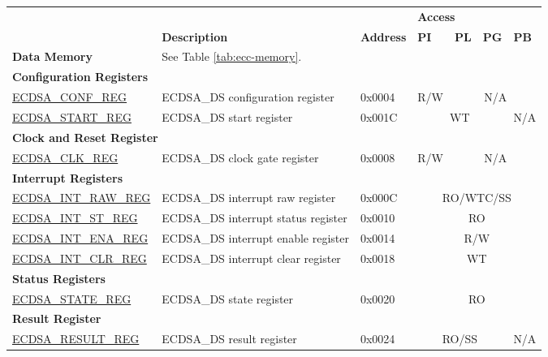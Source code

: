 \begin{longtable}{ | p{4.8cm} | l | p{1.3cm} | l | l | l | l | }
\hline
\rowcolor{lightgray}
 &  &   & \multicolumn{4}{|l|}{\textbf{Access}} \\\cline{4-7}
\rowcolor{lightgray}
\multirow{-2}{*}{\textbf{Name}} & \multirow{-2}{*}{\textbf{Description}}  &  \multirow{-2}{*}{\textbf{Address}} & \textbf{PI} & \textbf{PL} & \textbf{PG} & \textbf{PB} \\ \hline
\endhead
\textbf{Data Memory} & \multicolumn{6}{|l|}{See Table \ref{tab:ecc-memory}.} \\ \hline
\multicolumn{7}{|l|}{\textbf{Configuration Registers}} \\\hline
\hyperref[regdesc:ECDSACONFREG]{ECDSA\_CONF\_REG} & ECDSA\_DS configuration register & 0x0004 & R/W & \multicolumn{3}{|c|}{N/A} \\ \hline
\hyperref[regdesc:ECDSASTARTREG]{ECDSA\_START\_REG} & ECDSA\_DS start register & 0x001C & \multicolumn{3}{|c|}{WT} & N/A \\ \hline
\multicolumn{7}{|l|}{\textbf{Clock and Reset Register}} \\ \hline
\hyperref[regdesc:ECDSACLKREG]{ECDSA\_CLK\_REG} & ECDSA\_DS clock gate register & 0x0008 & R/W & \multicolumn{3}{|c|}{N/A} \\ \hline
\multicolumn{7}{|l|}{\textbf{Interrupt Registers}} \\ \hline
\hyperref[regdesc:ECDSAINTRAWREG]{ECDSA\_INT\_RAW\_REG} & ECDSA\_DS interrupt raw register & 0x000C & \multicolumn{4}{|c|}{RO/WTC/SS} \\ \hline
\hyperref[regdesc:ECDSAINTSTREG]{ECDSA\_INT\_ST\_REG} & ECDSA\_DS interrupt status register & 0x0010 & \multicolumn{4}{|c|}{RO} \\ \hline
\hyperref[regdesc:ECDSAINTENAREG]{ECDSA\_INT\_ENA\_REG} & ECDSA\_DS interrupt enable register & 0x0014 & \multicolumn{4}{|c|}{R/W} \\ \hline
\hyperref[regdesc:ECDSAINTCLRREG]{ECDSA\_INT\_CLR\_REG} & ECDSA\_DS interrupt clear register & 0x0018 & \multicolumn{4}{|c|}{WT} \\ \hline
\multicolumn{7}{|l|}{\textbf{Status Registers}} \\ \hline
\hyperref[regdesc:ECDSASTATEREG]{ECDSA\_STATE\_REG} & ECDSA\_DS state register & 0x0020 & \multicolumn{4}{|c|}{RO} \\ \hline
\multicolumn{7}{|l|}{\textbf{Result Register}} \\ \hline
\hyperref[regdesc:ECDSARESULTREG]{ECDSA\_RESULT\_REG} & ECDSA\_DS result register & 0x0024 & \multicolumn{3}{|c|}{RO/SS} & N/A \\ \hline

\end{longtable}
